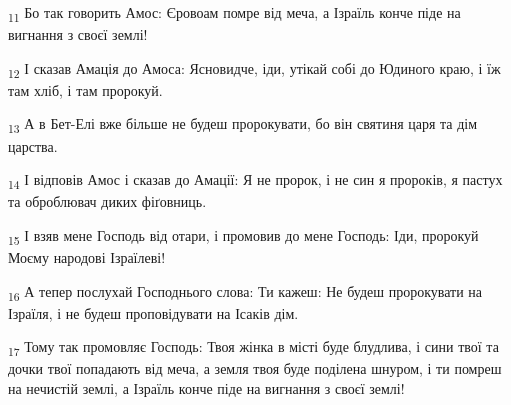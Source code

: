 \begin{tcolorbox}
\textsubscript{11} Бо так говорить Амос: Єровоам помре від меча, а Ізраїль конче піде на вигнання з своєї землі!
\end{tcolorbox}
\begin{tcolorbox}
\textsubscript{12} І сказав Амація до Амоса: Ясновидче, іди, утікай собі до Юдиного краю, і їж там хліб, і там пророкуй.
\end{tcolorbox}
\begin{tcolorbox}
\textsubscript{13} А в Бет-Елі вже більше не будеш пророкувати, бо він святиня царя та дім царства.
\end{tcolorbox}
\begin{tcolorbox}
\textsubscript{14} І відповів Амос і сказав до Амації: Я не пророк, і не син я пророків, я пастух та оброблювач диких фіґовниць.
\end{tcolorbox}
\begin{tcolorbox}
\textsubscript{15} І взяв мене Господь від отари, і промовив до мене Господь: Іди, пророкуй Моєму народові Ізраїлеві!
\end{tcolorbox}
\begin{tcolorbox}
\textsubscript{16} А тепер послухай Господнього слова: Ти кажеш: Не будеш пророкувати на Ізраїля, і не будеш проповідувати на Ісаків дім.
\end{tcolorbox}
\begin{tcolorbox}
\textsubscript{17} Тому так промовляє Господь: Твоя жінка в місті буде блудлива, і сини твої та дочки твої попадають від меча, а земля твоя буде поділена шнуром, і ти помреш на нечистій землі, а Ізраїль конче піде на вигнання з своєї землі!
\end{tcolorbox}
